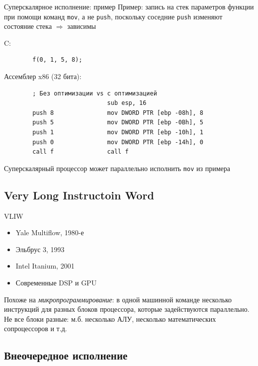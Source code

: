 \documentclass[xetex,aspectratio=43]{beamer}
\begin{document}
\begin{frame}[fragile]{Суперскалярное исполнение: пример}
    Пример: запись на стек параметров функции при помощи команд \texttt{mov}, а не \texttt{push}, поскольку соседние \texttt{push} изменяют состояние стека $\Rightarrow$ зависимы

    C:
    \begin{verbatim}
        f(0, 1, 5, 8);
    \end{verbatim}

    Ассемблер x86 (32 бита):
    \begin{verbatim}
        ; Без оптимизации vs с оптимизацией
                             sub esp, 16
        push 8               mov DWORD PTR [ebp -08h], 8
        push 5               mov DWORD PTR [ebp -0Bh], 5
        push 1               mov DWORD PTR [ebp -10h], 1
        push 0               mov DWORD PTR [ebp -14h], 0
        call f               call f
    \end{verbatim}

    Суперскалярный процессор может параллельно исполнить \texttt{mov} из примера
\end{frame}

\subsection{Very Long Instructoin Word}

\begin{frame}{VLIW}

    \begin{itemize}
        \item Yale Multiflow, 1980-е
        \item Эльбрус 3, 1993
        \item Intel Itanium, 2001
        \item Современные DSP и GPU
    \end{itemize}

    Похоже на \emph{микропрограммирование}: в одной машинной команде несколько инструкций для разных блоков процессора, которые задействуются параллельно. Не все блоки разные: м.б. несколько АЛУ, несколько математических сопроцессоров и т.д.
\end{frame}

\subsection{Внеочередное исполнение}
\end{document}
